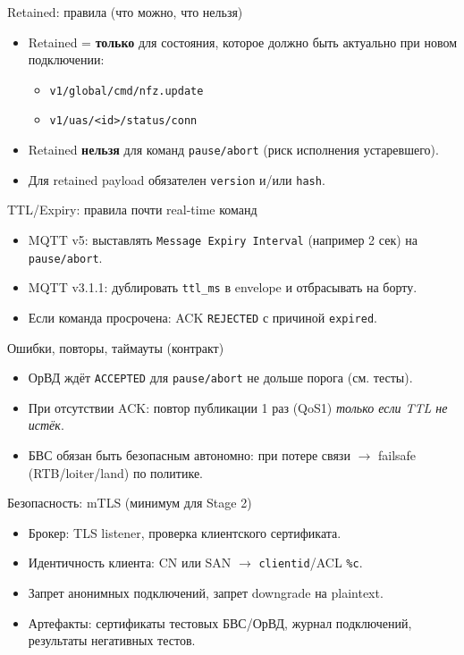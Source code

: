 \documentclass[aspectratio=169]{beamer}
\begin{document}
\begin{frame}{Retained: правила (что можно, что нельзя)}
\begin{itemize}
  \item Retained = \textbf{только} для состояния, которое должно быть актуально при новом подключении:
  \begin{itemize}
    \item \texttt{v1/global/cmd/nfz.update}
    \item \texttt{v1/uas/<id>/status/conn}
  \end{itemize}
  \item Retained \textbf{нельзя} для команд \texttt{pause/abort} (риск исполнения устаревшего).
  \item Для retained payload обязателен \texttt{version} и/или \texttt{hash}.
\end{itemize}
\end{frame}

\begin{frame}{TTL/Expiry: правила почти real-time команд}
\begin{itemize}
  \item MQTT v5: выставлять \texttt{Message Expiry Interval} (например 2 сек) на \texttt{pause/abort}.
  \item MQTT v3.1.1: дублировать \texttt{ttl\_ms} в envelope и отбрасывать на борту.
  \item Если команда просрочена: ACK \texttt{REJECTED} с причиной \texttt{expired}.
\end{itemize}
\end{frame}

\begin{frame}{Ошибки, повторы, таймауты (контракт)}
\begin{itemize}
  \item ОрВД ждёт \texttt{ACCEPTED} для \texttt{pause/abort} не дольше порога (см. тесты).
  \item При отсутствии ACK: повтор публикации 1 раз (QoS1) \textit{только если TTL не истёк}.
  \item БВС обязан быть безопасным автономно: при потере связи $\rightarrow$ failsafe (RTB/loiter/land) по политике.
\end{itemize}
\end{frame}

\begin{frame}{Безопасность: mTLS (минимум для Stage 2)}
\begin{itemize}
  \item Брокер: TLS listener, проверка клиентского сертификата.
  \item Идентичность клиента: CN или SAN $\rightarrow$ \texttt{clientid}/ACL \texttt{\%c}.
  \item Запрет анонимных подключений, запрет downgrade на plaintext.
  \item Артефакты: сертификаты тестовых БВС/ОрВД, журнал подключений, результаты негативных тестов.
\end{itemize}
\end{frame}
\end{document}
